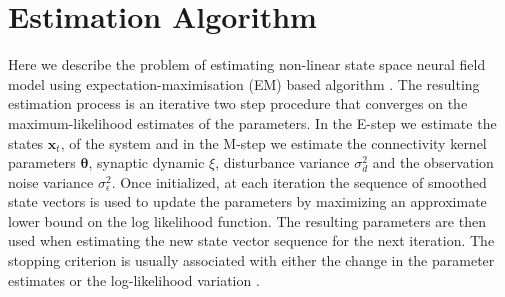 \documentclass[]{article}
\begin{document}
\section{Estimation Algorithm}\label{sec:EstimationAlgorithm}
Here we describe the problem of estimating non-linear state space neural field model using expectation-maximisation (EM) based algorithm \cite{Dempster1977,Shumway2000}. The resulting estimation process is an iterative two step procedure that converges on the maximum-likelihood estimates of the parameters. In the E-step we estimate the states $\mathbf x_t$, of the system and in the M-step we estimate the connectivity kernel parameters $\boldsymbol \theta$, synaptic dynamic $\xi$, disturbance variance $\sigma^2_d$ and the observation noise variance $\sigma^2_{\epsilon}$. Once initialized, at each iteration the sequence of smoothed state vectors is used to update the parameters by maximizing an approximate lower bound on the log likelihood function. The resulting parameters are then used when estimating the new
state vector sequence for the next iteration. The stopping criterion is usually associated with either the change in the parameter estimates or the log-likelihood variation \cite{McLachlan1997}.
\end{document}
